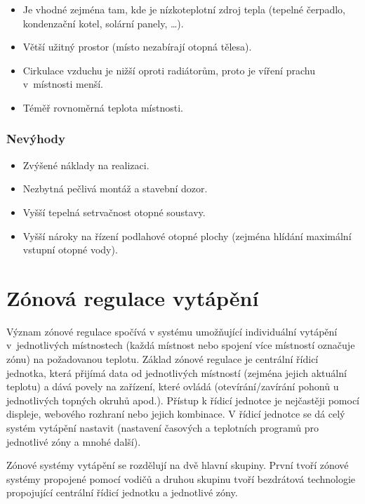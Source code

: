 \begin{itemize}
  \item Je vhodné zejména tam, kde je nízkoteplotní zdroj tepla (tepelné čerpadlo, kondenzační kotel, solární panely, …).
  \item Větší užitný prostor (místo nezabírají otopná tělesa).
  \item Cirkulace vzduchu je nižší oproti radiátorům, proto je víření prachu v~místnosti menší.
  \item Téměř rovnoměrná teplota místnosti.
\end{itemize}

\subsubsection{Nevýhody}

\begin{itemize}
  \item Zvýšené náklady na realizaci.
  \item Nezbytná pečlivá montáž a stavební dozor.
  \item Vyšší tepelná setrvačnost otopné soustavy.
  \item Vyšší nároky na řízení podlahové otopné plochy (zejména hlídání maximální vstupní otopné vody).
\end{itemize}


\section{Zónová regulace vytápění}

Význam zónové regulace spočívá v systému umožňující individuální vytápění v~jednotlivých místnostech (každá místnost nebo spojení více místností označuje zónu) na požadovanou teplotu.  Základ zónové regulace je centrální řídicí jednotka, která přijímá data od jednotlivých místností (zejména jejich aktuální teplotu) a dává povely na zařízení, které ovládá (otevírání/zavírání pohonů u jednotlivých topných okruhů apod.). Přístup k řídicí jednotce je nejčastěji pomocí displeje, webového rozhraní nebo jejich kombinace. V řídicí jednotce se dá celý systém vytápění nastavit (nastavení časových a teplotních programů pro jednotlivé zóny a mnohé další). 

Zónové systémy vytápění se rozdělují na dvě hlavní skupiny. První tvoří zónové systémy propojené pomocí vodičů a druhou skupinu tvoří bezdrátová technologie propojující centrální řídicí jednotku a jednotlivé zóny. 

